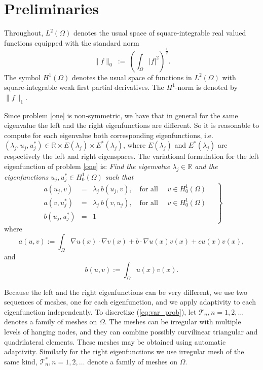 \documentclass[smallextended]{svjour3}
\newcommand{\cT}{\mathcal{T}}
\begin{document}

\section{Preliminaries}\label{sec:preli}

Throughout, $L^2(\Omega)$
denotes the usual space of square-integrable real valued functions
equipped with the standard norm
\begin{equation}\label{eq:l2}
\|f\|_{0}\ := \ \left(\int_\Omega  |f|^2\right)^{\frac{1}{2}} .
\end{equation}
The symbol $H^1(\Omega)$ denotes the usual space of functions in $L^2(\Omega)$
with square-integrable weak first partial derivatives. The $H^1$-norm is 
denoted by $\|f\|_1$.

Since problem \eqref{one} is non-symmetric, we have that in general for the same eigenvalue the left and the right eigenfunctions are different. So it is reasonable to compute for each eigenvalue both corresponding eigenfunctions, i.e. $(\lambda_j,u_j,u_j^*)\in \mathbb{R}\times E(\lambda_j)\times E^*(\lambda_j)$, where $E(\lambda_j)$ and $E^*(\lambda_j)$ are respectively the left and right eigenspaces.
The variational formulation for the left eigenfunction of problem \eqref{one} is:
\emph{Find the eigenvalue $\lambda_j\in \mathbb{R}$ and the eigenfunctions $u_j,u_j^*\in H^1_0(\Omega)$
such that}
\begin{equation}
\label{eq:var_prob}
\left.
\begin{array}{lcl}
a(u_j,v)&=& \lambda_j\ b(u_j,v),
\quad \text{for all } \quad v  \in H^1_0(\Omega)\\
a(v,u_j^*)&=& \lambda_j\ b(v,u_j),
\quad \text{for all } \quad v  \in H^1_0(\Omega)\\
 b(u_j,u_j^*) &=& 1
\end{array}\quad
\right\}
\end{equation}
where
\begin{equation}\label{eq:a}
a(u,v):=\int_\Omega \nabla u(x)\cdot \nabla v(x) + b\cdot \nabla u(x) v(x) + cu(x)v(x),
\end{equation}
and
\begin{equation}\label{eq:b}
b(u,v):=\int_\Omega u(x) v(x).
\end{equation}



Because the left and the right eigenfunctions can be very different, we use two sequences of meshes, one for each eigenfunction, and we apply adaptivity to each eigenfunction independently. 
To discretize (\ref{eq:var_prob}), let $\cT_n, n =
1,2,\ldots $ denotes a family of meshes on $\Omega$.
The meshes can be irregular with multiple levels of hanging nodes, 
and they can combine possibly curvilinear triangular and quadrilateral 
elements. These meshes may be obtained using automatic adaptivity. 
Similarly for the right eigenfunctions we use irregular mesh of the same kind,  $\cT_n^*, n =
1,2,\ldots $ denote a family of meshes on $\Omega$.
\end{document}
